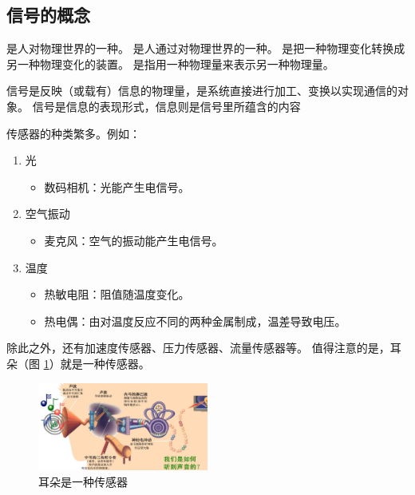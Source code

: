 \subsection{信号的概念}

\begin{definition}[信号]
    是人对物理世界的一种。
    是人通过对物理世界的一种。
    是把一种物理变化转换成另一种物理变化的装置。
    是指用一种物理量来表示另一种物理量。

    信号是反映（或载有）信息的物理量，是系统直接进行加工、变换以实现通信的对象。
    信号是信息的表现形式，信息则是信号里所蕴含的内容
\end{definition}

\begin{example}[传感器]
    传感器的种类繁多。例如：
    \begin{enumerate}
        \item 光
            \begin{itemize}
                \item 数码相机：光能产生电信号。
            \end{itemize}
        \item 空气振动
            \begin{itemize}
                \item 麦克风：空气的振动能产生电信号。
            \end{itemize}
        \item 温度
            \begin{itemize}
                \item 热敏电阻：阻值随温度变化。
                \item 热电偶：由对温度反应不同的两种金属制成，温差导致电压。
            \end{itemize}
    \end{enumerate}

    除此之外，还有加速度传感器、压力传感器、流量传感器等。
    值得注意的是，耳朵（图 \ref{fig:ear}）就是一种传感器。
    \begin{figure}[H]
        \centering
        \includegraphics[width=0.5\textwidth]{chap1/img/ear.png}
        \caption{耳朵是一种传感器}
        \label{fig:ear}
    \end{figure}
\end{example}

